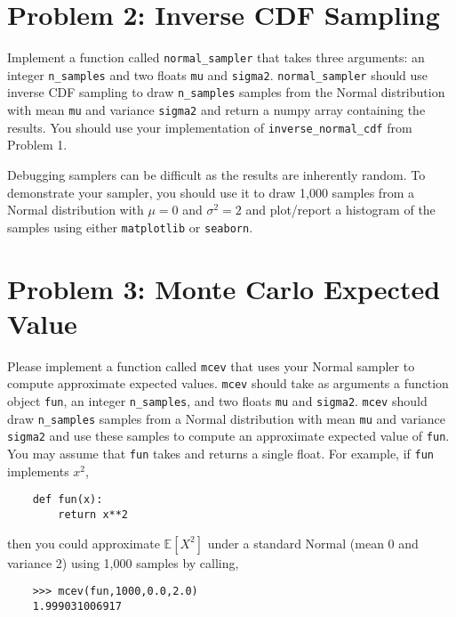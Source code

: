 \documentclass[11pt]{article} %
\begin{document}
\section*{Problem 2: Inverse CDF Sampling}
Implement a function called \verb|normal_sampler| that takes three arguments: an integer \verb|n_samples| and two floats \verb|mu| and \verb|sigma2|. \verb|normal_sampler| should use inverse CDF sampling to draw \verb|n_samples| samples from the Normal distribution with mean \verb|mu| and variance \verb|sigma2| and return a numpy array containing the results. You should use your implementation of \verb|inverse_normal_cdf| from Problem 1. 

Debugging samplers can be difficult as the results are inherently random. To demonstrate your sampler, you should use it to draw 1,000 samples from a Normal distribution with $\mu=0$ and $\sigma^2 = 2$ and plot/report a histogram of the samples using either \verb|matplotlib| or \verb|seaborn|. 

\section*{Problem 3: Monte Carlo Expected Value}
Please implement a function called \verb|mcev| that uses your Normal sampler to compute approximate expected values. \verb|mcev| should take as arguments a function object \verb|fun|, an integer \verb|n_samples|, and two floats \verb|mu| and \verb|sigma2|. \verb|mcev| should draw \verb|n_samples| samples from a Normal distribution with mean \verb|mu| and variance \verb|sigma2| and use these samples to compute an approximate expected value of \verb|fun|. You may assume that \verb|fun| takes and returns a single float. For example, if \verb|fun| implements $x^2$,

\begin{verbatim}
	def fun(x):
	    return x**2
\end{verbatim}

then you could approximate $\mathbb{E}[X^2]$ under a standard Normal (mean 0 and variance 2) using 1,000 samples by calling,

\begin{verbatim}
	>>> mcev(fun,1000,0.0,2.0)
	1.999031006917
\end{verbatim}
\end{document}
